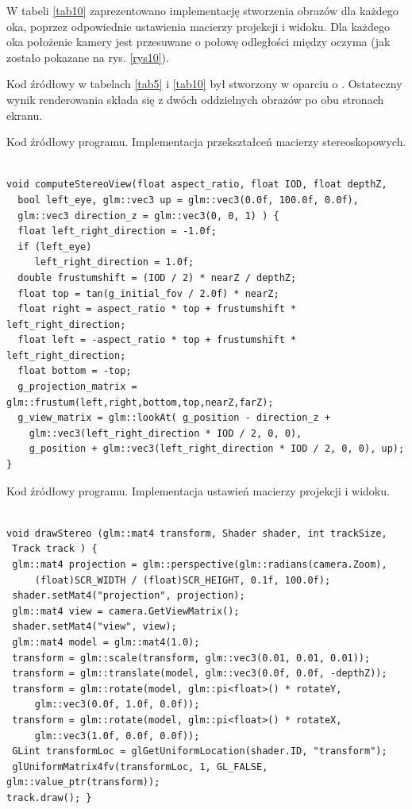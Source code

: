 W tabeli \ref{tab10} zaprezentowano implementację stworzenia obrazów dla każdego oka, poprzez odpowiednie ustawienia macierzy projekcji i widoku. Dla każdego oka położenie kamery jest przesuwane o połowę odległości między oczyma (jak zostało pokazane na rys. \ref{rys10}). 

Kod źródłowy w tabelach \ref{tab5} i \ref{tab10} był stworzony w oparciu o \cite{openglCookbook}. Ostateczny wynik renderowania składa się z dwóch oddzielnych obrazów po obu stronach ekranu.

\newpage
\begin{table}[H]
\caption{Kod źródłowy programu. Implementacja przekształceń macierzy stereoskopowych.}
\label{tab5}
\begin{lstlisting}[frame=single]  % Start your code-block

void computeStereoView(float aspect_ratio, float IOD, float depthZ, 
  bool left_eye, glm::vec3 up = glm::vec3(0.0f, 100.0f, 0.0f), 
  glm::vec3 direction_z = glm::vec3(0, 0, 1) ) {
  float left_right_direction = -1.0f;
  if (left_eye)
     left_right_direction = 1.0f;
  double frustumshift = (IOD / 2) * nearZ / depthZ;
  float top = tan(g_initial_fov / 2.0f) * nearZ;
  float right = aspect_ratio * top + frustumshift * left_right_direction;
  float left = -aspect_ratio * top + frustumshift * left_right_direction;
  float bottom = -top;
  g_projection_matrix = glm::frustum(left,right,bottom,top,nearZ,farZ);
  g_view_matrix = glm::lookAt( g_position - direction_z + 
  	glm::vec3(left_right_direction * IOD / 2, 0, 0),
    g_position + glm::vec3(left_right_direction * IOD / 2, 0, 0), up); }
\end{lstlisting}
\end{table}
\begin{table}[H]
\caption{Kod źródłowy programu. Implementacja ustawień macierzy projekcji i widoku.}
\label{tab10}
\begin{lstlisting}[frame=single]  % Start your code-block

void drawStereo (glm::mat4 transform, Shader shader, int trackSize,
 Track track ) {
 glm::mat4 projection = glm::perspective(glm::radians(camera.Zoom),
     (float)SCR_WIDTH / (float)SCR_HEIGHT, 0.1f, 100.0f);
 shader.setMat4("projection", projection);
 glm::mat4 view = camera.GetViewMatrix();
 shader.setMat4("view", view);
 glm::mat4 model = glm::mat4(1.0);
 transform = glm::scale(transform, glm::vec3(0.01, 0.01, 0.01));
 transform = glm::translate(model, glm::vec3(0.0f, 0.0f, -depthZ));
 transform = glm::rotate(model, glm::pi<float>() * rotateY, 
     glm::vec3(0.0f, 1.0f, 0.0f));
 transform = glm::rotate(model, glm::pi<float>() * rotateX, 
     glm::vec3(1.0f, 0.0f, 0.0f));
 GLint transformLoc = glGetUniformLocation(shader.ID, "transform");
 glUniformMatrix4fv(transformLoc, 1, GL_FALSE, glm::value_ptr(transform));
track.draw(); }
\end{lstlisting}
\end{table}


